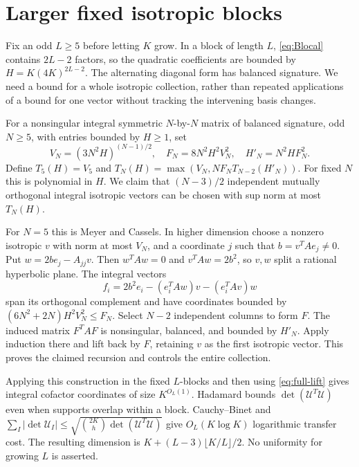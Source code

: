 \section{Larger fixed isotropic blocks}\label{app:fixedL}
Fix an odd $L\geq5$ before letting $K$ grow. In a block of length $L$,
\eqref{eq:Blocal} contains $2L-2$ factors, so the quadratic coefficients
are bounded by $H=K(4K)^{2L-2}$. The alternating diagonal form has
balanced signature. We need a bound for a whole isotropic collection,
rather than repeated applications of a bound for one vector without
tracking the intervening basis changes.

For a nonsingular integral symmetric $N$-by-$N$ matrix of balanced
signature, odd $N\geq5$, with entries bounded by $H\geq1$, set
\[
 V_N=(3N^2H)^{(N-1)/2},\quad F_N=8N^2H^2V_N^2,
 \quad H'_N=N^2HF_N^2.
\]
Define $T_5(H)=V_5$ and
$T_N(H)=\max(V_N,NF_NT_{N-2}(H'_N))$. For fixed $N$ this is
polynomial in $H$. We claim that $(N-3)/2$ independent mutually
orthogonal integral isotropic vectors can be chosen with sup norm at
most $T_N(H)$.

For $N=5$ this is Meyer and Cassels. In higher dimension choose a
nonzero isotropic $v$ with norm at most $V_N$, and a coordinate $j$
such that $b=v^TAe_j\ne0$. Put $w=2be_j-A_{jj}v$. Then
$w^TAw=0$ and $v^TAw=2b^2$, so $v,w$ split a rational hyperbolic
plane. The integral vectors
\[
 f_i=2b^2e_i-(e_i^TAw)v-(e_i^TAv)w
\]
span its orthogonal complement and have coordinates bounded by
$(6N^2+2N)H^2V_N^2\leq F_N$. Select $N-2$ independent columns to
form $F$. The induced matrix $F^TAF$ is nonsingular, balanced, and
bounded by $H'_N$. Apply induction there and lift back by $F$,
retaining $v$ as the first isotropic vector. This proves the claimed
recursion and controls the entire collection.

Applying this construction in the fixed $L$-blocks and then using
\eqref{eq:full-lift} gives integral cofactor coordinates of size
$K^{O_L(1)}$. Hadamard bounds $\det(\mathcal U^T\mathcal U)$ even
when supports overlap within a block. Cauchy--Binet and
$\sum_I|\det\mathcal U_I|\leq
\sqrt{\binom{2K}{h}\det(\mathcal U^T\mathcal U)}$
give $O_L(K\log K)$ logarithmic transfer cost. The resulting dimension
is $K+(L-3)\lfloor K/L\rfloor/2$. No uniformity for growing $L$
is asserted.

